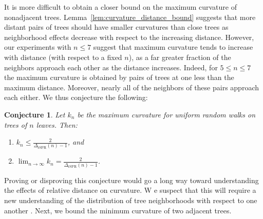 \documentclass[11pt,onecolumn,conference]{IEEEtran}
\newtheorem{conjecture}[theorem]{Conjecture}
\newcommand{\cuttable}[2][]{%
    \ifthenelse{\equal{#1}{}}%
		{}%
		{#1}%
}
\begin{document}
It is more difficult to obtain a closer bound on the maximum curvature of nonadjacent trees.
Lemma~\ref{lem:curvature_distance_bound} suggests that more distant pairs of trees should have smaller curvatures than close trees as neighborhood effects decrease with respect to the increasing distance.
However, our experiments with $n \le 7$ suggest that maximum curvature tends to increase with distance (with respect to a fixed $n$), as a far greater fraction of the neighbors approach each other as the distance increases.
Indeed, for $5 \le n \le 7$ the maximum curvature is obtained by pairs of trees at one less than the maximum distance.
Moreover, nearly all of the neighbors of these pairs approach each either.
We thus conjecture the following:
\begin{conjecture}
	Let $k_n$ be the maximum curvature for uniform random walks on trees of $n$ leaves.
	Then:
	\begin{enumerate}
		\item $k_n \le \frac{2}{\Delta_{\text{rSPR}}(n)-1}$, and
		\item $\lim_{n\rightarrow\infty} k_n  = \frac{2}{\Delta_{\text{rSPR}}(n)-1}$.
	\end{enumerate}
\end{conjecture}
Proving or disproving this conjecture would go a long way toward understanding the effects of relative distance on curvature.
\cuttable[W]{However, w}e suspect that this will require a \cuttable[new]{greater} understanding of the distribution of tree neighborhoods with respect to one another\cuttable{ than is currently known}.
Next, we bound the minimum curvature of two adjacent trees.
\end{document}
